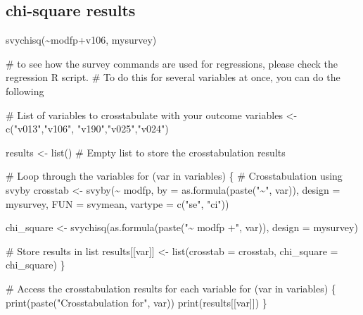 \documentclass[
  letterpaper,
  DIV=11,
  numbers=noendperiod]{scrartcl}
\newenvironment{Shaded}{\begin{snugshade}}{\end{snugshade}}
\newcommand{\AttributeTok}[1]{\textcolor[rgb]{0.40,0.45,0.13}{#1}}
\newcommand{\CommentTok}[1]{\textcolor[rgb]{0.37,0.37,0.37}{#1}}
\newcommand{\ControlFlowTok}[1]{\textcolor[rgb]{0.00,0.23,0.31}{#1}}
\newcommand{\FunctionTok}[1]{\textcolor[rgb]{0.28,0.35,0.67}{#1}}
\newcommand{\NormalTok}[1]{\textcolor[rgb]{0.00,0.23,0.31}{#1}}
\newcommand{\OtherTok}[1]{\textcolor[rgb]{0.00,0.23,0.31}{#1}}
\newcommand{\SpecialCharTok}[1]{\textcolor[rgb]{0.37,0.37,0.37}{#1}}
\newcommand{\StringTok}[1]{\textcolor[rgb]{0.13,0.47,0.30}{#1}}
\begin{document}
\hypertarget{chi-square-results}{%
\subsection{chi-square results}\label{chi-square-results}}

\begin{Shaded}
\begin{Highlighting}[]
\FunctionTok{svychisq}\NormalTok{(}\SpecialCharTok{\textasciitilde{}}\NormalTok{modfp}\SpecialCharTok{+}\NormalTok{v106, mysurvey)}

\CommentTok{\# to see how the survey commands are used for regressions, please check the regression R script. }
\CommentTok{\# To do this for several variables at once, you can do the following}

\CommentTok{\# List of variables to crosstabulate with your outcome}
\NormalTok{variables }\OtherTok{\textless{}{-}} \FunctionTok{c}\NormalTok{(}\StringTok{"v013"}\NormalTok{,}\StringTok{"v106"}\NormalTok{, }\StringTok{"v190"}\NormalTok{,}\StringTok{"v025"}\NormalTok{,}\StringTok{"v024"}\NormalTok{) }

\NormalTok{results }\OtherTok{\textless{}{-}} \FunctionTok{list}\NormalTok{()  }\CommentTok{\# Empty list to store the crosstabulation results}

\CommentTok{\# Loop through the variables}
\ControlFlowTok{for}\NormalTok{ (var }\ControlFlowTok{in}\NormalTok{ variables) \{}
  \CommentTok{\# Crosstabulation using svyby}
\NormalTok{  crosstab }\OtherTok{\textless{}{-}} \FunctionTok{svyby}\NormalTok{(}\SpecialCharTok{\textasciitilde{}}\NormalTok{ modfp, }\AttributeTok{by =} \FunctionTok{as.formula}\NormalTok{(}\FunctionTok{paste}\NormalTok{(}\StringTok{"\textasciitilde{}"}\NormalTok{, var)), }\AttributeTok{design =}\NormalTok{ mysurvey, }\AttributeTok{FUN =}\NormalTok{ svymean, }\AttributeTok{vartype =} \FunctionTok{c}\NormalTok{(}\StringTok{"se"}\NormalTok{, }\StringTok{"ci"}\NormalTok{))}
  
\NormalTok{  chi\_square }\OtherTok{\textless{}{-}} \FunctionTok{svychisq}\NormalTok{(}\FunctionTok{as.formula}\NormalTok{(}\FunctionTok{paste}\NormalTok{(}\StringTok{"\textasciitilde{} modfp +"}\NormalTok{, var)), }\AttributeTok{design =}\NormalTok{ mysurvey)}
  
  \CommentTok{\# Store results in list}
\NormalTok{  results[[var]] }\OtherTok{\textless{}{-}} \FunctionTok{list}\NormalTok{(}\AttributeTok{crosstab =}\NormalTok{ crosstab, }\AttributeTok{chi\_square =}\NormalTok{ chi\_square)}
\NormalTok{\}}

\CommentTok{\# Access the crosstabulation results for each variable}
\ControlFlowTok{for}\NormalTok{ (var }\ControlFlowTok{in}\NormalTok{ variables) \{}
  \FunctionTok{print}\NormalTok{(}\FunctionTok{paste}\NormalTok{(}\StringTok{"Crosstabulation for"}\NormalTok{, var))}
  \FunctionTok{print}\NormalTok{(results[[var]])}
\NormalTok{\}}
\end{Highlighting}
\end{Shaded}
\end{document}
